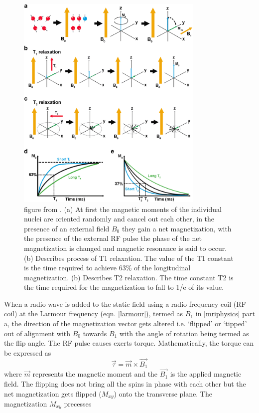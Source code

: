 \documentclass[msthesis.tex]{subfiles}
\begin{document}
\begin{figure}
\includegraphics[width=0.8\textwidth]{images/mri1.png}
\caption{figure from \cite{Mastrogiacomo2019}. (a) At first the magnetic moments of the individual nuclei are oriented randomly and cancel out each other, in the presence of an external field $B_0$ they gain a net magnetization, with the presence of the external RF pulse the phase of the net magnetization is changed and magnetic resonance is said to occur. (b) Describes process of T1 relaxation. The value of the T1 constant is the time required to achieve 63\% of the longitudinal magnetization. (b) Describes T2 relaxation. The time constant T2 is the time required for the magnetization to fall to 1/e of its value.}
\label{mriphysics}
\end{figure}

When a radio wave is added to the static field using a radio frequency coil (RF coil) at the Larmour frequency (eqn. \autoref{larmour}), termed as $B_1$ in \autoref{mriphysics} part a, the direction of the magnetization vector gets altered i.e. ‘flipped’ or ‘tipped’ out of alignment with $B_0$ towards $B_1$ with the angle of rotation being termed as the flip angle. The RF pulse causes exerts torque. Mathematically, the torque can be expressed as
\begin{equation}
    \Vec{\tau} = \Vec{m} \times \Vec{B_1}
\end{equation}
where $\Vec{m}$ represents the magnetic moment and the $ \Vec{B_1}$ is the applied magnetic field.
 The flipping does not bring all the spins in phase with each other but the net magnetization gets flipped ($M_{xy}$) onto the transverse plane. The magnetization $M_{xy}$ precesses 
\end{document}
